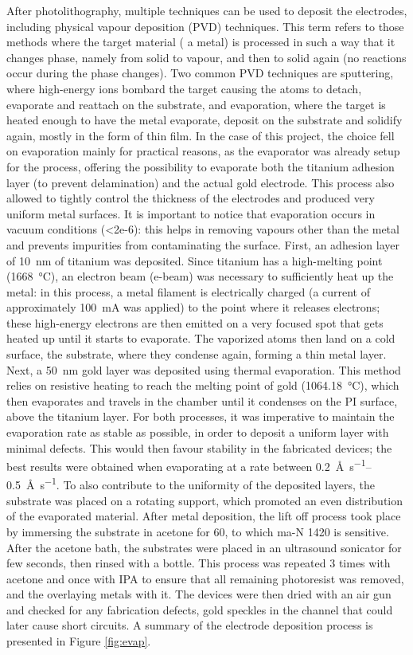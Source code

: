 After photolithography, multiple techniques can be used to deposit the
electrodes, including physical vapour deposition (PVD) techniques. This term
refers to those methods where the target material (\eg{} a metal) is processed
in such a way that it changes phase, namely from solid to vapour, and then to
solid again (no reactions occur during the phase changes). Two common PVD
techniques are sputtering, where high-energy ions bombard the target causing the
atoms to detach, evaporate and reattach on the substrate, and evaporation, where
the target is heated enough to have the metal evaporate, deposit on the
substrate and solidify again, mostly in the form of thin film. In the case of
this project, the choice fell on evaporation mainly for practical reasons, as
the evaporator was already setup for the process, offering the possibility to
evaporate both the titanium adhesion layer (to prevent delamination) and the
actual gold electrode. This process also allowed to tightly control the
thickness of the electrodes and produced very uniform metal surfaces. It is
important to notice that evaporation occurs in vacuum conditions
(\SI{<2e-6}{\mbar}): this helps in removing vapours other than the metal and
prevents impurities from contaminating the surface. First, an adhesion layer of
\SI{10}{\nm} of titanium was deposited. Since titanium has a high-melting point
(\SI{1668}{\celsius}), an electron beam (e-beam) was necessary to sufficiently
heat up the metal: in this process, a metal filament is electrically charged (a
current of approximately \SI{100}{\mA} was applied) to the point where it
releases electrons; these high-energy electrons are then emitted on a very
focused spot that gets heated up until it starts to evaporate. The vaporized
atoms then land on a cold surface, \ie{} the substrate, where they condense
again, forming a thin metal layer. Next, a \SI{50}{\nm} gold layer was deposited
using thermal evaporation. This method relies on resistive heating to reach the
melting point of gold (\SI{1064.18}{\celsius}), which then evaporates and
travels in the chamber until it condenses on the PI surface, above the titanium
layer. For both processes, it was imperative to maintain the evaporation rate as
stable as possible, in order to deposit a uniform layer with minimal defects.
This would then favour stability in the fabricated devices; the best results
were obtained when evaporating at a rate between
\SIrange{0.2}{0.5}{\angstrom\per\second}. To also contribute to the uniformity
of the deposited layers, the substrate was placed on a rotating support, which
promoted an even distribution of the evaporated material. After metal
deposition, the lift off process took place by immersing the substrate in
acetone for \SI{60}{\min}, to which ma-N 1420 is sensitive. After the acetone
bath, the substrates were placed in an ultrasound sonicator for few seconds,
then rinsed with a bottle. This process was repeated 3 times with acetone and
once with IPA to ensure that all remaining photoresist was removed, and the
overlaying metals with it. The devices were then dried with an air gun and
checked for any fabrication defects, \eg{} gold speckles in the channel that
could later cause short circuits. A summary of the electrode deposition process
is presented in Figure \ref{fig:evap}.

